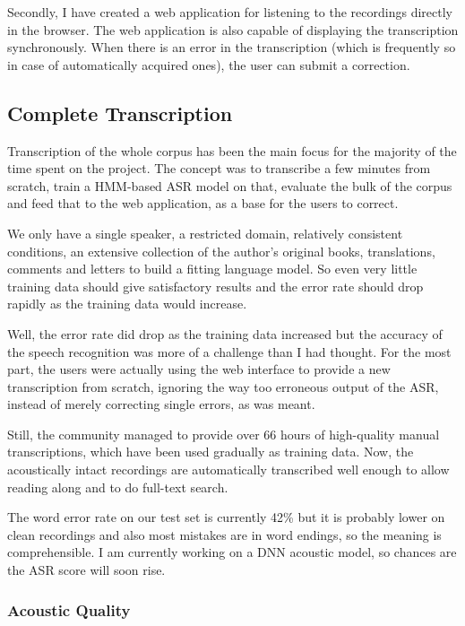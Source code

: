 \documentclass[a4paper,11pt]{article}
\begin{document}
Secondly, I have created a web application for listening to the recordings
directly in the browser. The web application is also capable of displaying the
transcription synchronously. When there is an error in the transcription (which
is frequently so in case of automatically acquired ones), the user can submit a
correction.

\subsection{Complete Transcription}

Transcription of the whole corpus has been the main focus for the majority of
the time spent on the project. The concept was to transcribe a few minutes from
scratch, train a HMM-based ASR model on that, evaluate the bulk of the corpus
and feed that to the web application, as a base for the users to correct.

We only have a single speaker, a restricted domain, relatively consistent
conditions, an extensive collection of the author's original books,
translations, comments and letters to build a fitting language model. So
even very little training data should give satisfactory results and the error
rate should drop rapidly as the training data would increase.

Well, the error rate did drop as the training data increased but the accuracy of
the speech recognition was more of a challenge than I had thought. For the most
part, the users were actually using the web interface to provide a new
transcription from scratch, ignoring the way too erroneous output of the ASR,
instead of merely correcting single errors, as was meant.

Still, the community managed to provide over 66 hours of high-quality manual
transcriptions, which have been used gradually as training data. Now, the
acoustically intact recordings are automatically transcribed well enough to
allow reading along and to do full-text search.

The word error rate on our test set is currently 42\% but it is probably lower
on clean recordings and also most mistakes are in word endings, so the meaning
is comprehensible. I am currently working on a DNN acoustic model, so chances
are the ASR score will soon rise.

\subsubsection{Acoustic Quality}
\end{document}
